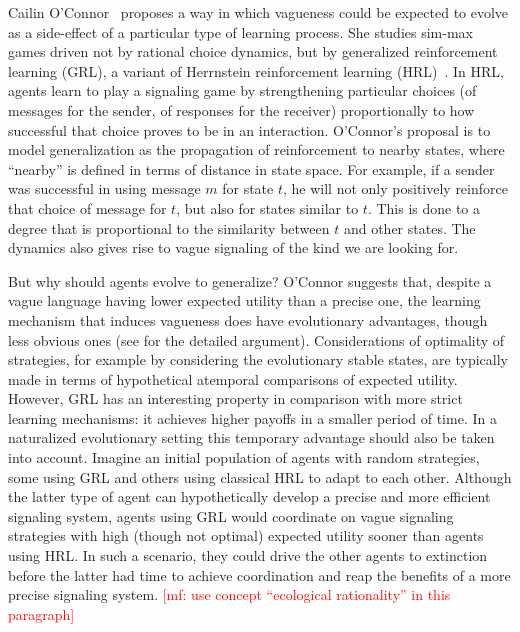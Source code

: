 \documentclass[a4paper]{article}
\newcommand{\mf}[1]{\textcolor{Red}{[mf: #1]}}
\begin{document}
Cailin O'Connor~\parencite*{oconnor_evolution_2014} proposes a way in which vagueness could be expected to evolve as a side-effect of a particular type of learning process.
She studies sim-max games driven not by rational choice dynamics, but by generalized reinforcement learning (GRL), a variant of Herrnstein reinforcement learning (HRL)~\parencite{roth_learning_1995}.
In HRL, agents learn to play a signaling game by strengthening particular choices (of messages for the sender, of responses for the receiver) proportionally to how successful that choice proves to be in an interaction.
O'Connor's proposal is to model generalization as the propagation of reinforcement to nearby states, where ``nearby'' is defined in terms of distance in state space.
For example, if a sender was successful in using message $m$ for state $t$, he will not only positively reinforce that choice of message for $t$, but also for states similar to $t$.
This is done to a degree that is proportional to the similarity between $t$ and other states.
The dynamics also gives rise to vague signaling of the kind we are looking for.

But why should agents evolve to generalize?
O'Connor suggests that, despite a vague language having lower expected utility than a precise one, the learning mechanism that induces vagueness does have evolutionary advantages, though less obvious ones (see \textcite{oconnor_evolving_2015} for the detailed argument).
Considerations of optimality of strategies, for example by considering the evolutionary stable states, are typically made in terms of hypothetical atemporal comparisons of expected utility.
However, GRL has an interesting property in comparison with more strict learning mechanisms: it achieves higher payoffs in a smaller period of time.
In a naturalized evolutionary setting this temporary advantage should also be taken into account.
Imagine an initial population of agents with random strategies, some using GRL and others using classical HRL to adapt to each other.
Although the latter type of agent can hypothetically develop a precise and more efficient signaling system, agents using GRL would coordinate on vague signaling strategies with high (though not optimal) expected utility sooner than agents using HRL.
In such a scenario, they could drive the other agents to extinction before the latter had time to achieve coordination and reap the benefits of a more precise signaling system.
\mf{use concept ``ecological rationality'' in this paragraph}
\end{document}
